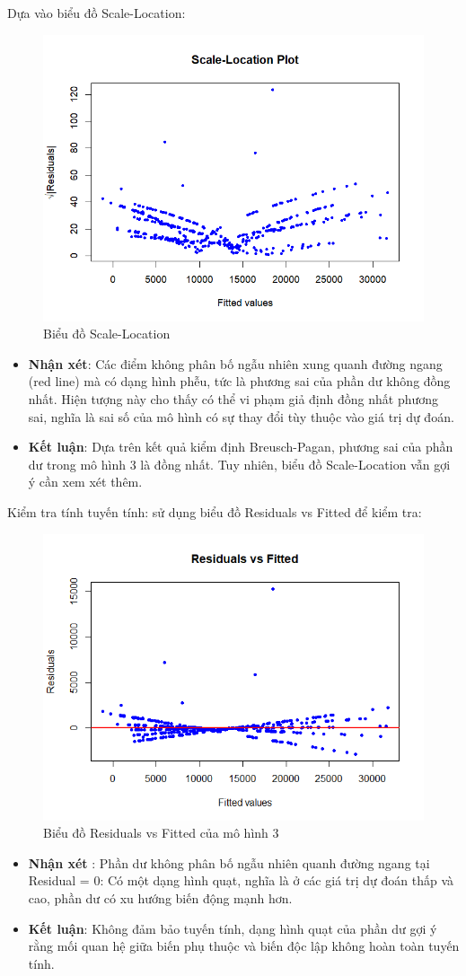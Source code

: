 Dựa vào biểu đồ Scale-Location:

\begin{figure}[H]
  \centering
  \includegraphics[width=0.5\linewidth]{graphics/5.5.11.png}
  \caption{Biểu đồ Scale-Location }
\end{figure}

\begin{itemize}
  \item\textbf{Nhận xét}: Các điểm không phân bố ngẫu nhiên xung quanh đường ngang (red line) mà có dạng hình phễu, tức là phương sai của phần dư không đồng nhất. Hiện tượng này cho thấy có thể vi phạm giả định đồng nhất phương sai, nghĩa là sai số của mô hình có sự thay đổi tùy thuộc vào giá trị dự đoán.
  \item\textbf{Kết luận}: Dựa trên kết quả kiểm định Breusch-Pagan, phương sai của phần dư trong mô hình 3 là đồng nhất.
  Tuy nhiên, biểu đồ Scale-Location vẫn gợi ý cần xem xét thêm.
\end{itemize}

Kiểm tra tính tuyến tính: sử dụng biểu đồ Residuals vs Fitted để kiểm tra:

\begin{figure}[H]
  \centering
  \includegraphics[width=0.5\linewidth]{graphics/5.5.12.png}
  \caption{Biểu đồ Residuals vs Fitted của mô hình 3 }
\end{figure}
\begin{itemize}
\item\textbf{Nhận xét }: Phần dư không phân bố ngẫu nhiên quanh đường ngang tại Residual = 0: Có một dạng hình quạt, nghĩa là ở các giá trị dự đoán thấp và cao, phần dư có xu hướng biến động mạnh hơn.
\item\textbf{Kết luận}: Không đảm bảo tuyến tính, dạng hình quạt của phần dư gợi ý rằng mối quan hệ giữa biến phụ thuộc và biến độc lập không hoàn toàn tuyến tính.
\end{itemize}


